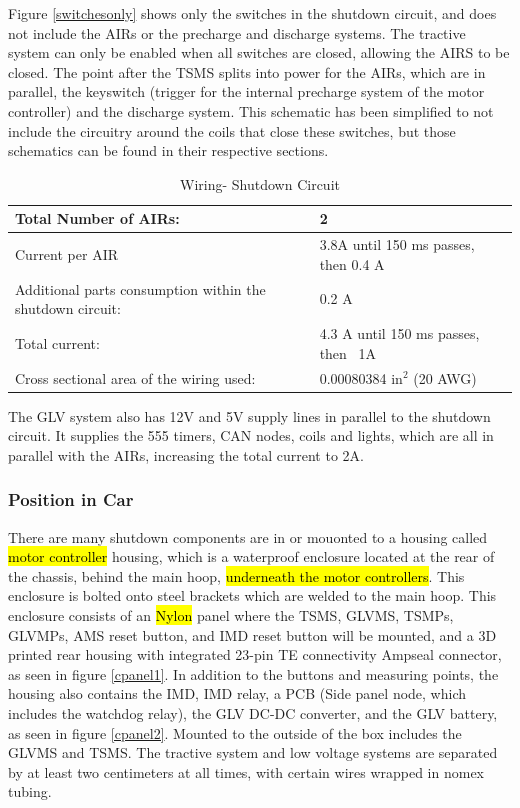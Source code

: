 \documentclass{article}
\DeclareRobustCommand{\hlr}[1]{{\sethlcolor{red}\hl{#1}}}
\begin{document}
            Figure \ref{switchesonly} shows only the switches in the shutdown circuit, and does not include the AIRs or the precharge and discharge systems. The tractive system can only be enabled when all switches are closed, allowing the AIRS to be closed. The point after the TSMS splits into power for the AIRs, which are in parallel, the keyswitch (trigger for the internal precharge system of the motor controller) and the discharge system. This schematic has been simplified to not include the circuitry around the coils that close these switches, but those schematics can be found in their respective sections.

            \begin{table}[H]
                \centering
                \begin{tabular}{|l|l|}
                \hline
                    Total Number of AIRs: & 2 \\ \hline
                    Current per AIR & 3.8A until 150 ms passes, then 0.4 A \\ \hline
                    Additional parts consumption within the shutdown circuit: & 0.2 A\\ \hline
                    Total current: & 4.3 A until 150 ms passes, then ~1A \\ \hline
                    Cross sectional area of the wiring used: & 0.00080384 in$^{2}$ (20 AWG) \\ \hline
                \end{tabular}
                \caption{Wiring- Shutdown Circuit}
                \label{ShutdownCircuitTable}
            \end{table}

            The GLV system also has 12V and 5V supply lines in parallel to the shutdown circuit. It supplies the 555 timers, CAN nodes, coils and lights, which are all in parallel with the AIRs, increasing the total current to 2A.

        \subsubsection{Position in Car}

        There are many shutdown components are in or mouonted to a housing called \hlr{motor controller} housing, which is a waterproof enclosure located at the rear of the chassis, behind the main hoop, \hlr{underneath the motor controllers}.  This enclosure is bolted onto steel brackets which are welded to the main hoop.  This enclosure consists of an \hlr{Nylon} panel where the TSMS, GLVMS, TSMPs, GLVMPs, AMS reset button, and IMD reset button will be mounted, and a 3D printed rear housing with integrated 23-pin TE connectivity Ampseal connector, as seen in figure \ref{cpanel1}. In addition to the buttons and measuring points, the housing also contains the IMD, IMD relay, a PCB (Side panel node, which includes the watchdog relay), the GLV DC-DC converter, and the GLV battery, as seen in figure \ref{cpanel2}.  Mounted to the outside of the box includes the GLVMS and TSMS. The tractive system and low voltage systems are separated by at least two centimeters at all times, with certain wires wrapped in nomex tubing.
\end{document}
